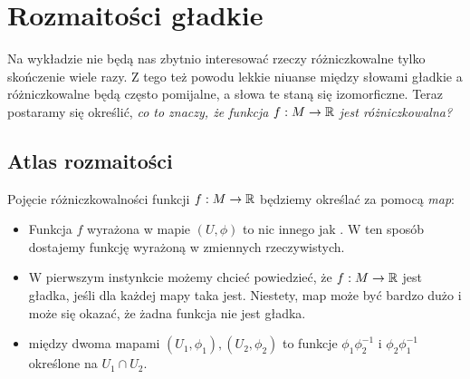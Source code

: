 \section{Rozmaitości gładkie}

Na wykładzie nie będą nas zbytnio interesować rzeczy różniczkowalne tylko skończenie wiele razy. Z tego też powodu lekkie niuanse między słowami gładkie a różniczkowalne będą często pomijalne, a słowa te staną się izomorficzne. Teraz postaramy się określić, \emph{co to znaczy, że funkcja $f:M\to\mathbb{R}$ jest różniczkowalna?}

%

\subsection{Atlas rozmaitości}
Pojęcie różniczkowalności funkcji $f:M\to\mathbb{R}$ będziemy określać za pomocą \emph{map}:
\begin{itemize}
    \item Funkcja $f$ wyrażona w mapie $(U,\phi)$ to nic innego jak . W ten sposób dostajemy funkcję wyrażoną w zmiennych rzeczywistych.
    \item W pierwszym instynkcie możemy chcieć powiedzieć, że $f:M\to\mathbb{R}$ jest gładka, jeśli dla każdej mapy taka jest. Niestety, map może być bardzo dużo i może się okazać, że żadna funkcja nie jest gładka.
    \item {} między dwoma mapami $(U_1,\phi_1),(U_2,\phi_2)$ to funkcje $\phi_1\phi_2^{-1}$ i $\phi_2\phi_1^{-1}$ określone na $U_1\cap U_2$.
\end{itemize}


